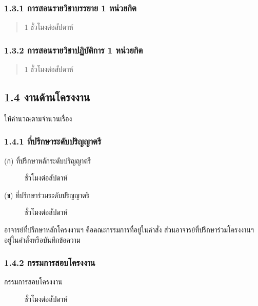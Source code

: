 \documentclass[a4paper,12pt,english]{sphinxmanual}
\begin{document}
\subsubsection{1.3.1 การสอนรายวิชาบรรยาย 1 หน่วยกิต}
\label{\detokenize{workload_rubric:id13}}\begin{quote}

1 ชั่วโมงต่อสัปดาห์
\end{quote}


\subsubsection{1.3.2 การสอนรายวิชาปฏิบัติการ 1 หน่วยกิต}
\label{\detokenize{workload_rubric:id14}}\begin{quote}

1 ชั่วโมงต่อสัปดาห์
\end{quote}


\subsection{1.4 งานด้านโครงงาน}
\label{\detokenize{workload_rubric:id15}}
ให้คำนวณตามจำนวนเรื่อง


\subsubsection{1.4.1 ที่ปรึกษาระดับปริญญาตรี}
\label{\detokenize{workload_rubric:id16}}\begin{description}
\item[{(ก) ที่ปรึกษาหลักระดับปริญญาตรี}]  ชั่วโมงต่อสัปดาห์

\item[{(ข) ที่ปรึกษาร่วมระดับปริญญาตรี}]  ชั่วโมงต่อสัปดาห์

\end{description}

อาจารย์ที่ปรึกษาหลักโครงงานฯ คือคณะกรรมการที่อยู่ในคำสั่ง ส่วนอาจารย์ที่ปรึกษาร่วมโครงงานฯ อยู่ในคำสั่งหรือบันทึกข้อความ


\subsubsection{1.4.2 กรรมการสอบโครงงาน}
\label{\detokenize{workload_rubric:id17}}\begin{description}
\item[{กรรมการสอบโครงงาน}]  ชั่วโมงต่อสัปดาห์

\end{description}
\end{document}
